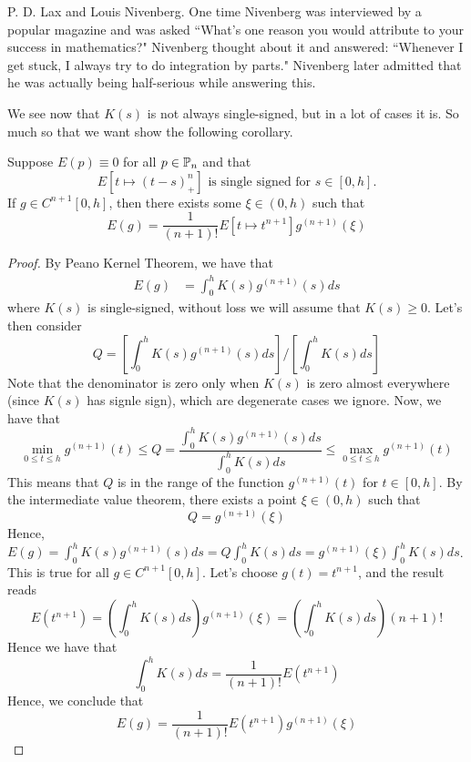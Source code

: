 \documentclass{article}
\begin{document}
\begin{remark}
    P. D. Lax and Louis Nivenberg. One time Nivenberg was interviewed by a popular magazine and was asked ``What's one reason you would attribute to your success in mathematics?" Nivenberg thought about it and answered: ``Whenever I get stuck, I always try to do integration by parts." Nivenberg later admitted that he was actually being half-serious while answering this.
\end{remark}

We see now that $K(s)$ is not always single-signed, but in a lot of cases it is. So much so that we want show the following corollary.
\begin{corollary}
    Suppose $E(p) \equiv 0$ for all $p \in \mathbb{P}_n$ and that 
    \[E[t \mapsto (t - s)^n_+] \text{ is single signed for $s \in [0, h]$.}\]
    If $g \in C^{n+1}[0, h]$, then there exists some $\xi \in (0, h)$ such that
    \[E(g) = \frac{1}{(n+1)!} E[t \mapsto t^{n+1}] g^{(n+1)}(\xi)\]
\end{corollary}

\begin{proof}
    By Peano Kernel Theorem, we have that 
    \begin{align*}
        E(g) &= \int_0^h K(s) g^{(n+1)}(s) ds
    \end{align*}
    where $K(s)$ is single-signed, without loss we will assume that $K(s) \geq 0$. Let's then consider
    \[Q = [\int_0^h K(s) g^{(n+1)}(s) ds] / [\int_0^h K(s) ds]\]
    Note that the denominator is zero only when $K(s)$ is zero almost everywhere (since $K(s)$ has signle sign), which are degenerate cases we ignore. Now, we have that
    \[\min_{0 \leq t \leq h} g^{(n+1)}(t) \leq Q = \frac{\int_0^h K(s) g^{(n+1)}(s) ds}{\int_0^h K(s) ds} \leq \max_{0 \leq t \leq h} g^{(n+1)}(t)\]
    This means that $Q$ is in the range of the function $g^{(n+1)}(t)$ for $t \in [0, h]$. By the intermediate value theorem, there exists a point $\xi \in (0, h)$ such that
    \[Q = g^{(n+1)}(\xi)\]
    Hence, $E(g) = \int_0^h K(s) g^{(n+1)}(s) ds = Q \int_0^h K(s) ds = g^{(n+1)}(\xi) \int_0^h K(s) ds$. This is true for all $g \in C^{n+1}[0, h]$. Let's choose $g(t) = t^{n+1}$, and the result reads
    \[E(t^{n+1}) = \left(\int_0^h K(s) ds\right) g^{(n+1)}(\xi) = \left(\int_0^h K(s) ds\right) (n+1)! \]
    Hence we have that
    \[\int_0^h K(s) ds = \frac{1}{(n+1)!} E(t^{n+1})\]
    Hence, we conclude that
    \[E(g) = \frac{1}{(n+1)!} E(t^{n+1}) g^{(n+1)}(\xi)\]
\end{proof}
\end{document}
